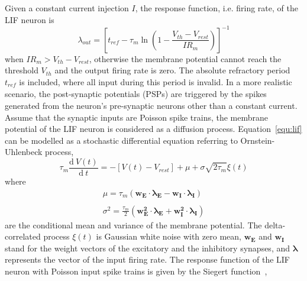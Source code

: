 \documentclass[journal]{journal}
\def\D{\mathrm{d}}
\begin{document}
Given a constant current injection $I$, the response function, i.e. firing rate, of the LIF neuron is
\begin{equation}
\lambda_\mathit{out}=
\left [ t_\mathit{ref}-\tau_m\ln \left ( 1-\frac{V_{th}-V_\mathit{rest}}{IR_m}  \right )\right ]^{-1}
\label{equ:consI}
\end{equation}
when $IR_m>V_{th}-V_{rest}$, otherwise the membrane potential cannot reach the threshold $V_{th}$ and the output firing rate is zero. 
The absolute refractory period $t_\mathit{ref}$ is included, where all input during this period is invalid.
In a more realistic scenario, the post-synaptic potentials (PSPs) are triggered by the spikes generated from the neuron's pre-synaptic neurons other than a constant current.
Assume that the synaptic inputs are Poisson spike trains, the membrane potential of the LIF neuron is considered as a diffusion process. Equation~\ref{equ:lif} can be modelled as a stochastic differential equation referring to Ornstein-Uhlenbeck process,
\begin{equation}
\tau_m\frac{\D\:V(t)}{\D\:  t}=-\left[V(t)-V_\mathit{rest}\right] + \mu + \sigma\sqrt{2\tau_m}\xi (t)
\label{equ:sde}
\end{equation}
where
\begin{equation}
\begin{array}{l}
\mu=\tau_m(\mathbf{w_E\cdot\lambda_E}-\mathbf{w_I\cdot\lambda_I})
\\
\\
\sigma ^{2} = \frac{\tau_m}{2}\left(\mathbf{w_E^{2}\cdot\lambda_E}+\mathbf{w_I^{2}\cdot\lambda_I}\right)
\end{array}
\label{equ:ou}
\end{equation}
are the conditional mean and variance of the membrane potential.
The delta-correlated process $\xi(t)$ is Gaussian white noise with zero mean, $\mathbf{w_E}$ and $\mathbf{w_I}$ stand for the weight vectors of the excitatory and the inhibitory synapses, and $\mathbf{\lambda}$ represents the vector of the input firing rate.
The response function of the LIF neuron with Poisson input spike trains is given by the Siegert function~\cite{siegert1951first}, 
\end{document}

